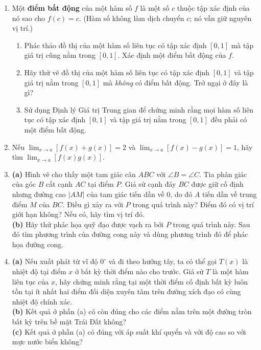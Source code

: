 \begin{minipage}[t]{0.73\textwidth}
\begin{enumerate}[label=\textbf{\arabic*.}, leftmargin=1.4em, itemsep=7pt, topsep=0pt, parsep=0pt]
    \item Một \textbf{điểm bất động} của một hàm số $f$ là một số $c$ thuộc tập xác định của nó sao cho $f(c) = c$. (Hàm số không làm dịch chuyển $c$; nó vẫn giữ nguyên vị trí.)
    \begin{enumerate}[label=\textbf{(\alph*)}, leftmargin=1.5em, itemsep=2pt, topsep=2pt]
      \item Phác thảo đồ thị của một hàm số liên tục có tập xác định $[0, 1]$ mà tập giá trị cũng nằm trong $[0, 1]$. Xác định một điểm bất động của $f$.
      \item Hãy thử vẽ đồ thị của một hàm số liên tục có tập xác định $[0, 1]$ và tập giá trị nằm trong $[0, 1]$ mà \textit{không} có điểm bất động. Trở ngại ở đây là gì?
      \item Sử dụng Định lý Giá trị Trung gian để chứng minh rằng mọi hàm số liên tục có tập xác định $[0, 1]$ và tập giá trị nằm trong $[0, 1]$ đều phải có một điểm bất động.
    \end{enumerate}

    \item Nếu $\displaystyle \lim_{x \to a} [f(x) + g(x)] = 2$ và $\displaystyle \lim_{x \to a} [f(x) - g(x)] = 1$, hãy tìm $\displaystyle \lim_{x \to a} [f(x)g(x)]$.

    \item \textbf{(a)} Hình vẽ cho thấy một tam giác cân $ABC$ với $\angle B = \angle C$. Tia phân giác của góc $B$ cắt cạnh $AC$ tại điểm $P$. Giả sử cạnh đáy $BC$ được giữ cố định nhưng đường cao $|AM|$ của tam giác tiến dần về $0$, do đó $A$ tiến dần về trung điểm $M$ của $BC$. Điều gì xảy ra với $P$ trong quá trình này? Điểm đó có vị trí giới hạn không? Nếu có, hãy tìm vị trí đó.\\[3pt]
    \textbf{(b)} Hãy thử phác họa quỹ đạo được vạch ra bởi $P$ trong quá trình này. Sau đó tìm phương trình của đường cong này và dùng phương trình đó để phác họa đường cong.

    \item \textbf{(a)} Nếu xuất phát từ vĩ độ $0^\circ$ và đi theo hướng tây, ta có thể gọi $T(x)$ là nhiệt độ tại điểm $x$ ở bất kỳ thời điểm nào cho trước. Giả sử $T$ là một hàm liên tục của $x$, hãy chứng minh rằng tại một thời điểm cố định bất kỳ luôn tồn tại ít nhất hai điểm đối diện xuyên tâm trên đường xích đạo có cùng nhiệt độ chính xác.\\[3pt]
    \textbf{(b)} Kết quả ở phần (a) có còn đúng cho các điểm nằm trên một đường tròn bất kỳ trên bề mặt Trái Đất không?\\[3pt]
    \textbf{(c)} Kết quả ở phần (a) có đúng với áp suất khí quyển và với độ cao so với mực nước biển không?


\end{enumerate}
\end{minipage}
